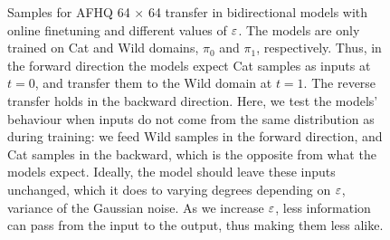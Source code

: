 \documentclass{article}
\begin{document}
\begin{figure}[htbp] 
    \centering 
    
    \hfill
    \hfill
    \caption{Samples for AFHQ 64 $\times$ 64 transfer in bidirectional models with online finetuning and different values of $\varepsilon$. The models are only trained on Cat and Wild domains, $\pi_0$ and $\pi_1$, respectively. Thus, in the forward direction the models expect Cat samples as inputs at $t=0$, and transfer them to the Wild domain at $t=1$. The reverse transfer holds in the backward direction. Here, we test the models' behaviour when inputs do not come from the same distribution as during training: we feed Wild samples in the forward direction, and Cat samples in the backward, which is the opposite from what the models expect. 
    Ideally, the model should leave these inputs unchanged, which it does to varying degrees depending on $\varepsilon$, variance of the Gaussian noise. As we increase $\varepsilon$, less information can pass from the input to the output, thus making them less alike.   
    } 
    \label{fig:afhq64_reverse} 
\end{figure}
\end{document}
